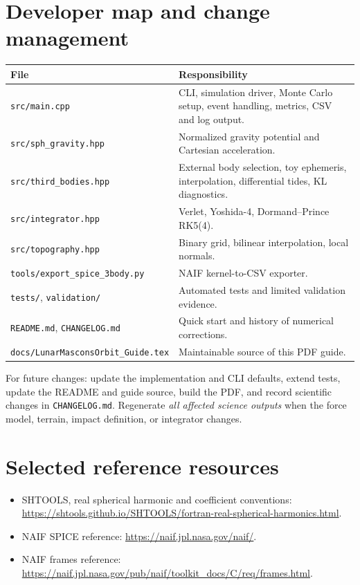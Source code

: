 \documentclass[11pt,a4paper]{article}
\newcommand{\pathcode}[1]{\nolinkurl{#1}}
\begin{document}
\section{Developer map and change management}
\begin{tabularx}{\linewidth}{@{}p{.35\linewidth}X@{}}
\toprule File & Responsibility\\\midrule
\pathcode{src/main.cpp} & CLI, simulation driver, Monte Carlo setup, event handling, metrics, CSV and log output.\\
\pathcode{src/sph_gravity.hpp} & Normalized gravity potential and Cartesian acceleration.\\
\pathcode{src/third_bodies.hpp} & External body selection, toy ephemeris, interpolation, differential tides, KL diagnostics.\\
\pathcode{src/integrator.hpp} & Verlet, Yoshida-4, Dormand--Prince RK5(4).\\
\pathcode{src/topography.hpp} & Binary grid, bilinear interpolation, local normals.\\
\pathcode{tools/export_spice_3body.py} & NAIF kernel-to-CSV exporter.\\
\pathcode{tests/}, \pathcode{validation/} & Automated tests and limited validation evidence.\\
\pathcode{README.md}, \pathcode{CHANGELOG.md} & Quick start and history of numerical corrections.\\
\pathcode{docs/LunarMasconsOrbit_Guide.tex} & Maintainable source of this PDF guide.\\
\bottomrule
\end{tabularx}

For future changes: update the implementation and CLI defaults, extend tests, update the README and guide source, build the PDF, and record scientific changes in \pathcode{CHANGELOG.md}. Regenerate \emph{all affected science outputs} when the force model, terrain, impact definition, or integrator changes.

\section*{Selected reference resources}
\begin{itemize}
\item SHTOOLS, real spherical harmonic and coefficient conventions: \url{https://shtools.github.io/SHTOOLS/fortran-real-spherical-harmonics.html}.
\item NAIF SPICE reference: \url{https://naif.jpl.nasa.gov/naif/}.
\item NAIF frames reference: \url{https://naif.jpl.nasa.gov/pub/naif/toolkit_docs/C/req/frames.html}.
\end{itemize}
\end{document}
